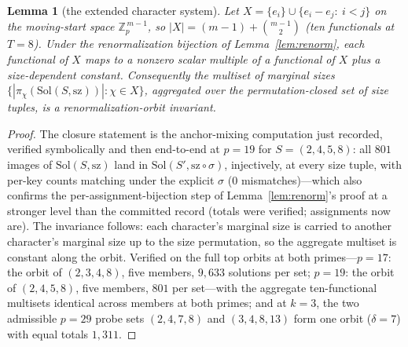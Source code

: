 \documentclass[11pt,a4paper]{article}
\numberwithin{equation}{section}
\theoremstyle{plain}
\newtheorem{lemma}[theorem]{Lemma}
\theoremstyle{definition}
\theoremstyle{remark}
\newcommand{\Z}{\mathbb{Z}}
\begin{document}
\begin{lemma}[the extended character system]\label{lem:char10}
Let $X=\{e_i\}\cup\{e_i-e_j:\ i<j\}$ on the moving-start space
$\Z_p^{\,m-1}$, so $|X|=(m-1)+\binom{m-1}{2}$ (ten functionals at
$T=8$). Under the renormalization bijection of Lemma~\ref{lem:renorm},
each functional of $X$ maps to a nonzero scalar multiple of a
functional of $X$ plus a size-dependent constant. Consequently the
multiset of marginal sizes
$\{|\pi_\chi(\mathrm{Sol}(S,\mathrm{sz}))|:\chi\in X\}$, aggregated
over the permutation-closed set of size tuples, is a
renormalization-orbit invariant.
\end{lemma}

\begin{proof}
The closure statement is the anchor-mixing computation just recorded,
verified symbolically and then end-to-end at $p=19$ for
$S=(2,4,5,8)$: all $801$ images of $\mathrm{Sol}(S,\mathrm{sz})$ land
in $\mathrm{Sol}(S',\mathrm{sz}\circ\sigma)$, injectively, at every
size tuple, with per-key counts matching under the explicit $\sigma$
($0$ mismatches)---which also confirms the per-assignment-bijection
step of Lemma~\ref{lem:renorm}'s proof at a stronger level than the
committed record (totals were verified; assignments now are). The
invariance follows: each character's marginal size is carried to
another character's marginal size up to the size permutation, so the
aggregate multiset is constant along the orbit. Verified on the full
top orbits at both primes---$p=17$: the orbit of $(2,3,4,8)$, five
members, $9{,}633$ solutions per set; $p=19$: the orbit of
$(2,4,5,8)$, five members, $801$ per set---with the aggregate
ten-functional multisets identical across members at both primes; and
at $k=3$, the two admissible $p=29$ probe sets $(2,4,7,8)$ and
$(3,4,8,13)$ form one orbit ($\delta=7$) with equal totals $1{,}311$.
\end{proof}
\end{document}
